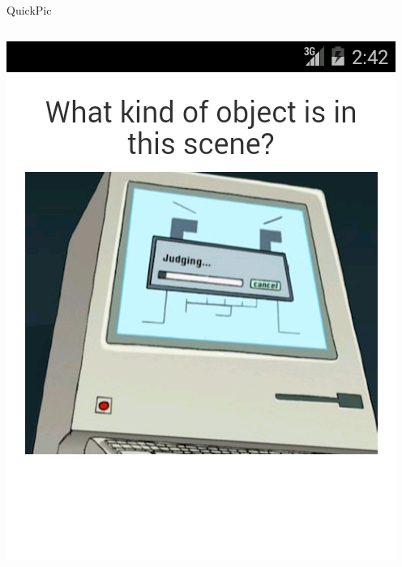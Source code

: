 \documentclass[aspectratio=169]{beamer}
\begin{document}
\begin{frame}{QuickPic}
  \begin{columns}[c]
    \begin{column}{0.3\columnwidth}
      \centering
      \includegraphics[width=\textwidth,height=\textheight,keepaspectratio]{ss_quickpic_image}
    \end{column}
    \begin{column}{0.3\columnwidth}
      \centering

\end{column}
\end{columns}
\end{frame}
\end{document}
